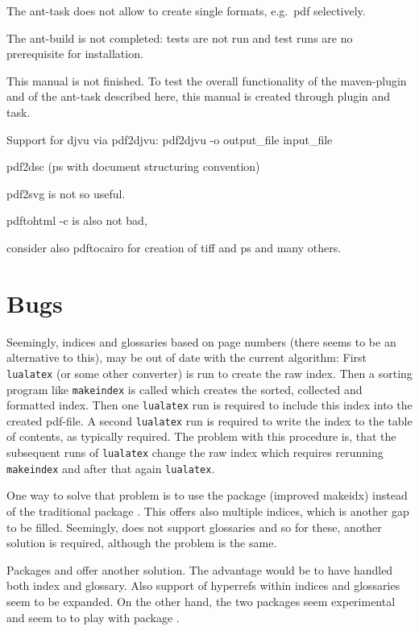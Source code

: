 \documentclass[12pt]{book}
\begin{document}
The ant-task does not allow to create single formats, e.g.~pdf selectively. 

The ant-build is not completed: tests are not run and 
test runs are no prerequisite for installation. 

This manual is not finished. 
To test the overall functionality of the maven-plugin and of the ant-task 
described here, this manual is created through plugin and task. 

Support for djvu via pdf2djvu: 
pdf2djvu -o output\_file input\_file

pdf2dsc
(ps with document structuring convention) 

pdf2svg is not so useful. 

pdftohtml -c is also not bad, 

consider also pdftocairo for creation of tiff and ps and many others. 

\chapter{Bugs}\label{chap:bugs}

Seemingly, indices and glossaries based on page numbers 
(there seems to be an alternative to this), 
may be out of date with the current algorithm: 
First \texttt{lualatex} (or some other converter) is run to create the raw index. 
Then a sorting program like \texttt{makeindex} is called 
which creates the sorted, collected and formatted index. 
Then one \texttt{lualatex} run is required to include this index 
into the created pdf-file. 
A second \texttt{lualatex} run is required 
to write the index to the table of contents, as typically required. 
The problem with this procedure is, 
that the subsequent runs of \texttt{lualatex} change the raw index 
which requires rerunning \texttt{makeindex} 
and after that again \texttt{lualatex}. 

One way to solve that problem is to use the package  
(improved makeidx) instead of the traditional package . 
This offers also multiple indices, which is another gap to be filled. 
Seemingly,  does not support glossaries 
and so for these, another solution is required, 
although the problem is the same. 

Packages  and  
offer another solution. 
The advantage would be to have handled both index and glossary. 
Also support of hyperrefs within indices and glossaries seem to be expanded. 
On the other hand, the two packages seem experimental 
and seem to to play with package . 
\end{document}
